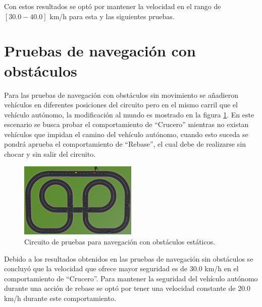 Con estos resultados se optó por mantener la velocidad en el rango de $[30.0-40.0]$ km/h para esta y las siguientes pruebas.

\section{Pruebas de navegación con obstáculos} \label{sec:pruebas_de _navegación_con_obstáculos}

Para las pruebas de navegación con obstáculos sin movimiento se añadieron vehículos en diferentes posiciones del circuito pero en el mismo carril que el vehículo autónomo, la modificación al mundo es mostrado en la figura \ref{fig:navigation_static_obstacles}. En este escenario se busca probar el comportamiento de ``Crucero'' mientras no existan vehículos que impidan el camino del vehículo autónomo, cuando esto suceda se pondrá aprueba el comportamiento de ``Rebase'', el cual debe de realizarse sin chocar y sin salir del circuito.
\begin{figure}[h]
    \centering
    \includegraphics[width=0.5\textwidth]{Figures/Figures_Cap07/navigation_static_obstacles.png}
    \caption{Circuito de pruebas para navegación con obstáculos estáticos.}
    \label{fig:navigation_static_obstacles}
\end{figure}

Debido a los resultados obtenidos en las pruebas de navegación sin obstáculos se concluyó que la velocidad que ofrece mayor seguridad es de 30.0 km/h en el comportamiento de ``Crucero''. Para mantener la seguridad del vehículo autónomo durante una acción de rebase se optó por tener una velocidad constante de 20.0 km/h durante este comportamiento. 

